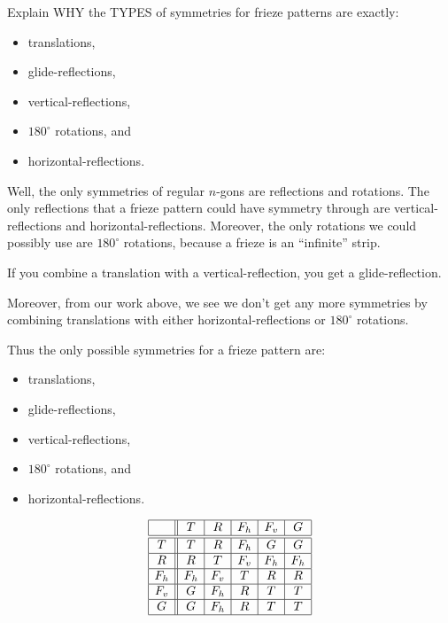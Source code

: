 \documentclass[noauthor,nooutcomes,hints,handout]{ximera}
\begin{document}
\begin{question}
  Explain WHY the TYPES of symmetries for frieze patterns are
  exactly:
  \begin{itemize}
  \item translations,
  \item glide-reflections,
  \item vertical-reflections,
  \item $180^\circ$ rotations, and
  \item horizontal-reflections.
  \end{itemize}
  \begin{freeResponse}
    Well, the only symmetries of regular $n$-gons are reflections and
    rotations. The only reflections that a frieze pattern could have
    symmetry through are vertical-reflections and
    horizontal-reflections. Moreover, the only rotations we could
    possibly use are $180^\circ$ rotations, because a frieze is an
    ``infinite'' strip.

    If you combine a translation with a vertical-reflection, you get a
    glide-reflection.

    Moreover, from our work above, we see we don't get any more
    symmetries by combining translations with either
    horizontal-reflections or $180^\circ$ rotations.

    Thus the only possible symmetries for a frieze pattern are:
    \begin{itemize}
    \item translations,
    \item glide-reflections,
    \item vertical-reflections,
    \item $180^\circ$ rotations, and
    \item horizontal-reflections.
    \end{itemize}
  \end{freeResponse}


\[
\begin{array}{|c||c|c|c|c|c|}
    \hline
        & T    & R    & F_h   & F_v & G     \\ \hline\hline
    T   & T    & R    & F_h   & G   & G     \\ \hline
    R   & R    & T    & F_v   & F_h & F_h   \\ \hline
    F_h & F_h  & F_v  & T     & R   & R   \\ \hline
    F_v & G    & F_h  & R     & T   & T   \\ \hline
    G   & G    & F_h  & R     & T   & T   \\ \hline
\end{array}
\]

  
\end{question}
\end{document}
